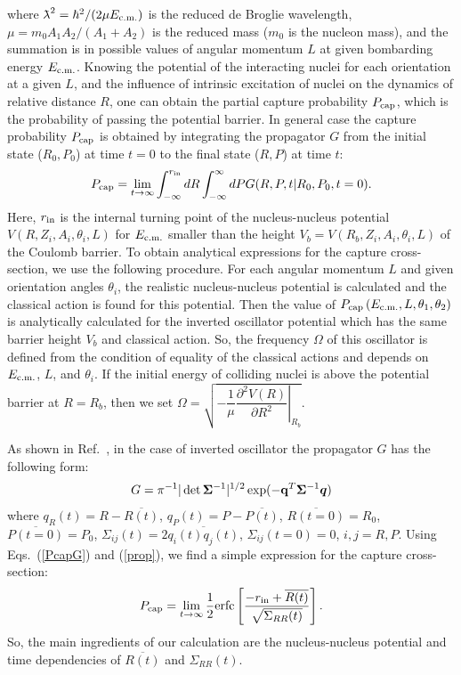 \documentclass[preprint,review,12pt]{elsarticle}
\newcommand{\lambdabar}{{\mkern0.75mu\mathchar '26\mkern -9.75mu\lambda}}
\begin{document}
  where $\lambdabar^2=\hbar^2/(2\mu E_{\rm c.m.})$ is the reduced de Broglie wavelength,
  $\mu=m_0 A_1 A_2/(A_1+A_2)$ is the reduced mass ($m_0$ is the nucleon mass), and the summation is in possible values of angular momentum $L$
  at given bombarding energy $E_{\rm c.m.}$.
  Knowing the potential of the interacting nuclei for each orientation at a given $L$, and the influence of intrinsic excitation of nuclei on the dynamics of
  relative distance $R$,  one can obtain the partial capture probability $P_{\rm cap}$, which is the probability of
  passing the potential barrier.
  In general case the capture probability $P_{\rm cap}$ is obtained by integrating the
  propagator $G$ from the initial state ($R_0, P_0$) at time $t = 0$ to
  the final state ($R,P$) at time $t$:
  \begin{eqnarray}
  P_{\rm cap}=\lim_{t\to\infty}\int_{-\infty}^{r_{\rm in}}dR\int_{-\infty}^{\infty}dP G(R,P,t|R_0,P_0,t=0).
  \label{PcapG}
  \end{eqnarray}
  Here, $r_{\rm in}$ is the internal turning point of the nucleus-nucleus potential
  $V(R,Z_i, A_i,\theta_i,L)$ for $E_{\rm c.m.}$ smaller than the height $V_b=V(R_b,Z_i, A_i,\theta_i,L)$
  of the Coulomb barrier. To obtain analytical expressions for the capture cross-section, we
  use the following procedure. For each angular momentum $L$ and given orientation angles $\theta_i$, the realistic nucleus-nucleus potential is calculated and the classical action is found for this potential.
  Then the value of $P_{\rm cap}\left(E_{\rm c.m.},L,\theta_1,\theta_2\right)$ is analytically
  calculated for the inverted oscillator potential which has the same barrier height $V_b$ and
  classical action. So, the frequency $\Omega$ of this oscillator is defined from the condition of equality of the
  classical actions and depends on $E_{\rm c.m.}$, $L$, and $\theta_i$.
  If the initial energy of colliding nuclei is above the potential barrier at $R=R_b$, then we set
  $\Omega=\sqrt{\left.-\dfrac{1}{\mu}\dfrac{\partial^2 V(R)}{\partial R^2}\right|_{R_b}}$.

  As shown in Ref.~\cite{DMDadonov}, in the case of inverted oscillator the propagator $G$ has the following form:
  \begin{eqnarray}
  G=\pi^{-1}|\det {\bf \Sigma}^{-1}|^{1/2} \exp(-{\bf q}^{T}{\bf \Sigma}^{-1}{\bm q})
  \label{prop}
  \end{eqnarray}
  where
  $q_R(t)=R-\overline{R(t)}$, $q_P(t)=P-\overline{P(t)}$, $\overline{R(t=0)}=R_0$,
  $\overline{P(t=0)}=P_0$, $\Sigma_{ij}(t)=2\overline{q_i(t)q_j(t)}$, $\Sigma_{ij}(t=0)=0$,
  $i,j=R,P$.
  Using Eqs.~(\ref{PcapG}) and (\ref{prop}), we find a simple expression for the capture cross-section:
  \begin{eqnarray}
  P_{\rm cap}=\lim_{t\to\infty}\frac{1}{2} {\rm erfc}\left[\frac{-r_{\rm in}+\overline{R(t)}} {{\sqrt{\Sigma_{RR}(t)}}}\right].
  \label{propPcap}
  \end{eqnarray}
  So, the main ingredients of our calculation are the nucleus-nucleus potential and
  time dependencies of $\overline{R(t)}$ and $\Sigma_{RR}(t)$.
\end{document}
